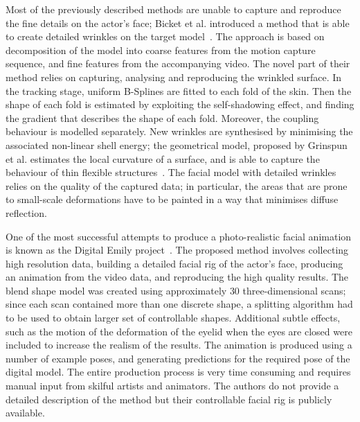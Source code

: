 \documentclass[11pt]{report}
\begin{document}
Most of the previously described methods are unable to capture and reproduce the fine details on the actor's face; Bicket et al. introduced a method that is able to create detailed wrinkles on the target model~\cite{Bickel:2007}. The approach is based on decomposition of the model into coarse features from the motion capture sequence, and fine features from the accompanying video. The novel part of their method relies on capturing, analysing and reproducing the wrinkled surface. In the tracking stage, uniform B-Splines are fitted to each fold of the skin. Then the shape of each fold is estimated by exploiting the self-shadowing effect, and finding the gradient that describes the shape of each fold. Moreover, the coupling behaviour is modelled separately. New wrinkles are synthesised by minimising the associated non-linear shell energy; the geometrical model, proposed by Grinspun et al. estimates the local curvature of a surface, and is able to capture the behaviour of thin flexible structures~\cite{Grinspun:2003}. The facial model with detailed wrinkles relies on the quality of the captured data; in particular, the areas that are prone to small-scale deformations have to be painted in a way that minimises diffuse reflection.

One of the most successful attempts to produce a photo-realistic facial animation is known as the Digital Emily project~\cite{Alexander:2009}. The proposed method involves collecting high resolution data, building a detailed facial rig of the actor's face, producing an animation from the video data, and reproducing the high quality results. The blend shape model was created using approximately $30$ three-dimensional scans; since each scan contained more than one discrete shape, a splitting algorithm had to be used to obtain larger set of controllable shapes. Additional subtle effects, such as the motion of the deformation of the eyelid when the eyes are closed were included to increase the realism of the results. The animation is produced using a number of example poses, and generating predictions for the required pose of the digital model. The entire production process is very time consuming and requires manual input from skilful artists and animators. The authors do not provide a detailed description of the method but their controllable facial rig is publicly available.
\end{document}

